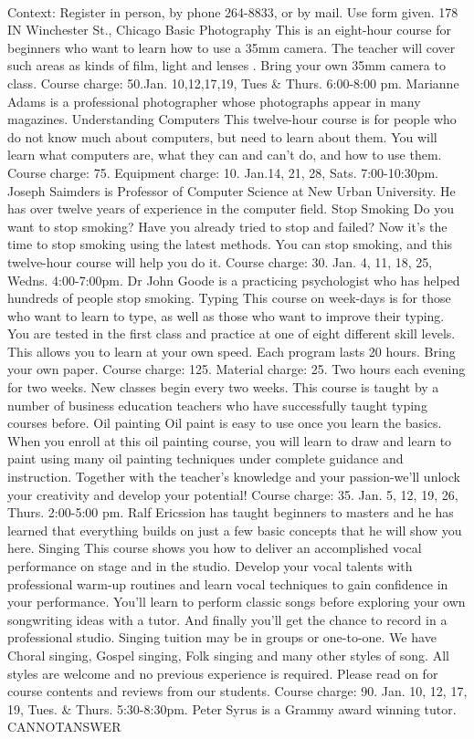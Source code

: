 \documentclass[11pt,a4paper, onecolumn]{article}
\begin{document}
\\ Context: Register in person, by phone 264-8833, or by mail. Use form given. 178 IN Winchester St., Chicago Basic Photography This is an eight-hour course for beginners who want to learn how to use a 35mm camera. The teacher will cover such areas as kinds of film, light and lenses . Bring your own 35mm camera to class. Course charge:  50.Jan. 10,12,17,19, Tues & Thurs. 6:00-8:00 pm. Marianne Adams is a professional photographer whose photographs appear in many magazines. Understanding Computers This twelve-hour course is for people who do not know much about computers, but need to learn about them. You will learn what computers are, what they can and can't do, and how to use them. Course charge:  75. Equipment charge:  10. Jan.14, 21, 28, Sats. 7:00-10:30pm. Joseph Saimders is Professor of Computer Science at New Urban University. He has over twelve years of experience in the computer field. Stop Smoking Do you want to stop smoking? Have you already tried to stop and failed? Now it's the time to stop smoking using the latest methods. You can stop smoking, and this twelve-hour course will help you do it. Course charge:  30. Jan. 4, 11, 18, 25, Wedns. 4:00-7:00pm. Dr John Goode is a practicing psychologist who has helped hundreds of people stop smoking. Typing This course on week-days is for those who want to learn to type, as well as those who want to improve their typing. You are tested in the first class and practice at one of eight different skill levels. This allows you to learn at your own speed. Each program lasts 20 hours. Bring your own paper. Course charge:  125. Material charge:  25. Two hours each evening for two weeks. New classes begin every two weeks. This course is taught by a number of business education teachers who have successfully taught typing courses before. Oil painting Oil paint is easy to use once you learn the basics. When you enroll at this oil painting course, you will learn to draw and learn to paint using many oil painting techniques under complete guidance and instruction. Together with the teacher's knowledge and your passion-we'll unlock your creativity and develop your potential! Course charge:  35. Jan. 5, 12, 19, 26, Thurs. 2:00-5:00 pm. Ralf Ericssion has taught beginners to masters and he has learned that everything builds on just a few basic concepts that he will show you here. Singing This course shows you how to deliver an accomplished vocal performance on stage and in the studio. Develop your vocal talents with professional warm-up routines and learn vocal techniques to gain confidence in your performance. You'll learn to perform classic songs before exploring your own songwriting ideas with a tutor. And finally you'll get the chance to record in a professional studio. Singing tuition may be in groups or one-to-one. We have Choral singing, Gospel singing, Folk singing and many other styles of song. All styles are welcome and no previous experience is required. Please read on for course contents and reviews from our students. Course charge:  90. Jan. 10, 12, 17, 19, Tues. & Thurs. 5:30-8:30pm. Peter Syrus is a Grammy award winning tutor. CANNOTANSWER
\end{document}
